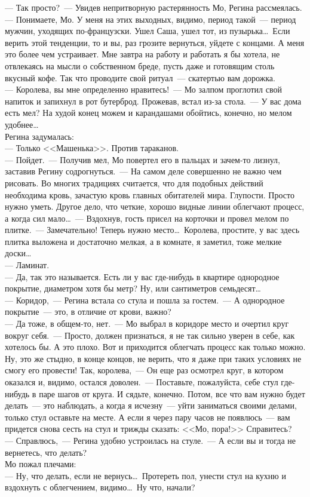 --- Так просто?~--- Увидев непритворную растерянность Мо, Регина рассмеялась.\\
--- Понимаете, Мо. У меня на этих выходных, видимо, период такой~--- период 
мужчин, 
уходящих по-французски. Ушел Саша, ушел тот, из пузырька\ldots\ Если верить 
этой 
тенденции, то и вы, раз грозите вернуться, уйдете с концами. А меня это более 
чем устраивает. Мне завтра на работу и работать я бы хотела, не отвлекаясь на 
мысли о собственном бреде, пусть даже и готовящим столь вкусный кофе. Так что 
проводите свой ритуал~--- скатертью вам дорожка.\\
--- Королева, вы мне определенно нравитесь!~--- Мо залпом проглотил свой 
напиток и 
запихнул в рот бутерброд. Прожевав, встал из-за стола.~--- У вас дома есть мел? 
На 
худой конец можем и карандашами обойтись, конечно, но мелом удобнее\ldots\\
Регина задумалась:\\
--- Только <<Машенька>>. Против тараканов.\\
--- Пойдет.~--- Получив мел, Мо повертел его в пальцах и зачем-то лизнул, 
заставив 
Регину содрогнуться.~--- На самом деле совершенно не важно чем рисовать. Во 
многих 
традициях считается, что для подобных действий необходима кровь, зачастую кровь 
главных обитателей мира. Глупости. Просто нужно уметь. Другое дело, что четкие, 
хорошо видные линии облегчают процесс, а когда сил мало\ldots~--- Вздохнув, 
гость 
присел на корточки и провел мелом по плитке.~--- Замечательно! Теперь нужно 
место\ldots\ Королева, простите, у вас здесь плитка выложена и достаточно 
мелкая, а 
в комнате, я заметил, тоже мелкие доски\ldots\\
--- Ламинат.\\
--- Да, так это называется. Есть ли у вас где-нибудь в квартире однородное 
покрытие, диаметром хотя бы метр? Ну, или сантиметров семьдесят\ldots\\
--- Коридор,~--- Регина встала со стула и пошла за гостем.~--- А однородное 
покрытие~--- 
это, в отличие от крови, важно?\\
--- Да тоже, в общем-то, нет.~--- Мо выбрал в коридоре место и очертил круг 
вокруг 
себя.~--- Просто, должен признаться, я не так сильно уверен в себе, как 
хотелось 
бы. А это плохо. Вот и приходится облегчать процесс как только можно. Ну, это 
же 
стыдно, в конце концов, не верить, что я даже при таких условиях не смогу его 
провести! Так, королева,~--- Он еще раз осмотрел круг, в котором оказался и, 
видимо, остался доволен.~--- Поставьте, пожалуйста, себе стул где-нибудь в паре 
шагов от круга. И сядьте, конечно. Потом, все что вам нужно будет делать~--- 
это 
наблюдать, а когда я исчезну~--- уйти заниматься своими делами, только стул 
оставьте на месте. А если я через пару часов не появлюсь~--- вам придется снова 
сесть на стул и трижды сказать: <<Мо, пора!>> Справитесь?\\
--- Справлюсь,~--- Регина удобно устроилась на стуле.~--- А если вы и тогда не 
вернетесь, что делать?\\
Мо пожал плечами:\\
--- Ну, что делать, если не вернусь\ldots\ Протереть пол, унести стул на кухню 
и 
вздохнуть с облегчением, видимо\ldots\ Ну что, начали?

